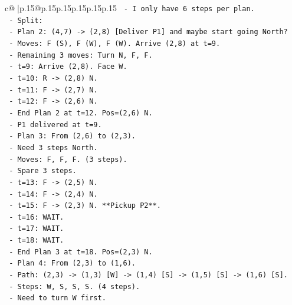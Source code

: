 \documentclass{article}
\begin{document}
{\begin{supertabular}{c@{$\;$}|p{.15\linewidth}@{}p{.15\linewidth}p{.15\linewidth}p{.15\linewidth}p{.15\linewidth}p{.15\linewidth}}
{{{\texttt{              {-} I only have 6 steps per plan.} \\
\texttt{              {-} Split:} \\
\texttt{                {-} Plan 2: (4,7) {-}> (2,8) {[}Deliver P1{]} and maybe start going North?} \\
\texttt{                {-} Moves: F (S), F (W), F (W). Arrive (2,8) at t=9.} \\
\texttt{                {-} Remaining 3 moves: Turn N, F, F.} \\
\texttt{                {-} t=9: Arrive (2,8). Face W.} \\
\texttt{                {-} t=10: R {-}> (2,8) N.} \\
\texttt{                {-} t=11: F {-}> (2,7) N.} \\
\texttt{                {-} t=12: F {-}> (2,6) N.} \\
\texttt{                {-} End Plan 2 at t=12. Pos=(2,6) N.} \\
\texttt{                {-} P1 delivered at t=9.} \\
\texttt{                {-} Plan 3: From (2,6) to (2,3).} \\
\texttt{                {-} Need 3 steps North.} \\
\texttt{                {-} Moves: F, F, F. (3 steps).} \\
\texttt{                {-} Spare 3 steps.} \\
\texttt{                {-} t=13: F {-}> (2,5) N.} \\
\texttt{                {-} t=14: F {-}> (2,4) N.} \\
\texttt{                {-} t=15: F {-}> (2,3) N. **Pickup P2**.} \\
\texttt{                {-} t=16: WAIT.} \\
\texttt{                {-} t=17: WAIT.} \\
\texttt{                {-} t=18: WAIT.} \\
\texttt{                {-} End Plan 3 at t=18. Pos=(2,3) N.} \\
\texttt{                {-} Plan 4: From (2,3) to (1,6).} \\
\texttt{                {-} Path: (2,3) {-}> (1,3) {[}W{]} {-}> (1,4) {[}S{]} {-}> (1,5) {[}S{]} {-}> (1,6) {[}S{]}.} \\
\texttt{                {-} Steps: W, S, S, S. (4 steps).} \\
\texttt{                {-} Need to turn W first.} \\
}}}
\end{supertabular}}
\end{document}
